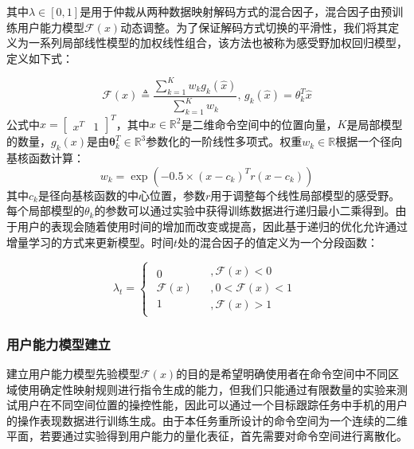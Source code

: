 其中$\lambda  \in [0,1]$是用于仲裁从两种数据映射解码方式的混合因子，混合因子由预训练用户能力模型$\mathcal{F} (x)$动态调整。为了保证解码方式切换的平滑性，我们将其定义为一系列局部线性模型的加权线性组合，该方法也被称为感受野加权回归模型\cite{schaalScalableTechniquesNonparametric2002}，定义如下式：

\begin{equation}
    \label{ex7}
    \mathcal{F} (x) \triangleq \frac{{\sum\nolimits_{k = 1}^K {{w_k}{g_k}(\hat x)} }}{{\sum\nolimits_{k = 1}^K {{w_k}} }}{\text{,  }}{g_k}(\hat x) = {\theta}_k^T{\hat x}
\end{equation}   
公式中$\hat x = {[\begin{array}{*{20}{c}}{{x^T}}&1\end{array}]^T}$，其中${x} \in {\mathbb{R}^2}$是二维命令空间中的位置向量，$K$是局部模型的数量，${g_k}(x)$是由${\boldsymbol{\theta }}_k^T \in {\mathbb{R}^{3}}$参数化的一阶线性多项式。权重${w_k\in {\mathbb{R}}}$根据一个径向基核函数计算：
\begin{equation}
    \label{ex8}
    {w_k} = \exp \left( { - 0.5 \times {{(x - {{c}_k})}^T}{{r}}(x - {c_k})} \right)
\end{equation}
其中$c_k$是径向基核函数的中心位置，参数$r$用于调整每个线性局部模型的感受野。每个局部模型的${\theta }_k$的参数可以通过实验中获得训练数据进行递归最小二乘得到。由于用户的表现会随着使用时间的增加而改变或提高，因此基于递归的优化允许通过增量学习的方式来更新模型。时间$t$处的混合因子的值定义为一个分段函数：

\begin{equation}
    \label{ex9}
    {\lambda _t} = \left \{{\begin{array}{*{20}{c}}
        {\begin{array}{*{20}{c}}
        0  \\  
        {\mathcal{F} (x)}  \\  
        1 
      \end{array}}&{\begin{array}{*{20}{c}}
        {,\mathcal{F} (x) < 0}  \\  
        {,0 < \mathcal{F} (x) < 1}  \\  
        {,\mathcal{F} (x) > 1} 
      \end{array}} 
      \end{array}} \right.
\end{equation}     

\subsubsection{用户能力模型建立}建立用户能力模型先验模型$\mathcal{F}(x)$的目的是希望明确使用者在命令空间中不同区域使用确定性映射规则进行指令生成的能力，但我们只能通过有限数量的实验来测试用户在不同空间位置的操控性能，因此可以通过一个目标跟踪任务中手机的用户的操作表现数据进行训练生成。由于本任务重所设计的命令空间为一个连续的二维平面，若要通过实验得到用户能力的量化表征，首先需要对命令空间进行离散化。  

